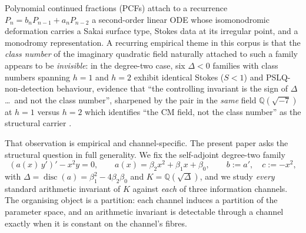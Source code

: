 \documentclass[11pt]{article}
\theoremstyle{definition}
\newcommand{\Q}{\mathbb{Q}}
\newcommand{\disc}{\operatorname{disc}}
\begin{document}
Polynomial continued fractions (PCFs) attach to a recurrence
$P_n=b_nP_{n-1}+a_nP_{n-2}$ a second-order linear ODE whose isomonodromic
deformation carries a Sakai surface type, Stokes data at its irregular point, and a
monodromy representation. A recurring empirical theme in this corpus is that the
\emph{class number} of the imaginary quadratic field naturally attached to such a
family appears to be \emph{invisible}: in the degree-two case, six $\Delta<0$
families with class numbers spanning $h=1$ and $h=2$ exhibit identical Stokes
($S<1$) and PSLQ-non-detection behaviour, evidence that ``the controlling invariant
is the sign of $\Delta$ \ldots\ and not the class number'', sharpened by the pair
in the \emph{same} field $\Q(\sqrt{-7})$ at $h=1$ versus $h=2$ which identifies
``the CM field, not the class number'' as the structural carrier
\cite{PCF1}.

That observation is empirical and channel-specific. The present paper asks the
structural question in full generality. We fix the self-adjoint degree-two family
\begin{equation}\label{eq:ode}
  (a(x)\,y')'-x^2y=0,\qquad a(x)=\beta_2x^2+\beta_1x+\beta_0,\qquad
  b:=a',\quad c:=-x^2,
\end{equation}
with $\Delta=\disc(a)=\beta_1^2-4\beta_2\beta_0$ and $K=\Q(\sqrt{\Delta})$, and we
study \emph{every} standard arithmetic invariant of $K$ against \emph{each} of three
information channels. The organising object is a partition: each channel induces a
partition of the parameter space, and an arithmetic invariant is detectable through a
channel exactly when it is constant on the channel's fibres.
\end{document}
